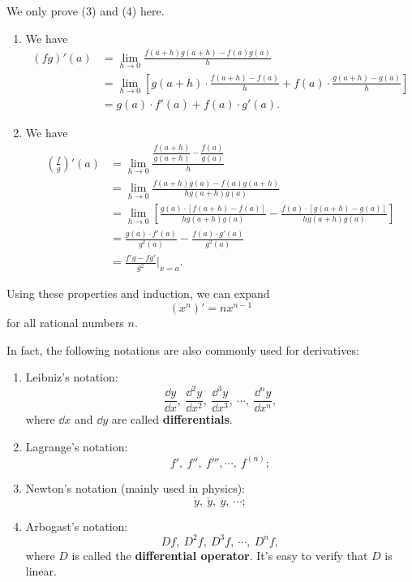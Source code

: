 	\begin{proofenv}
		We only prove (3) and (4) here.
		\begin{enumerate}
			\item[(3)] We have
			\[
			\begin{aligned}
				(fg)'(a) &= \lim_{h\to 0} \frac{f(a+h)g(a+h) - f(a)g(a)}{h}\\[6pt]
				&= \lim_{h\to 0} \left[ g(a+h)\cdot \frac{f(a+h)-f(a)}{h} + f(a)\cdot \frac{g(a+h)-g(a)}{h} \right]\\[6pt]
				&= g(a)\cdot f'(a) + f(a)\cdot g'(a).
			\end{aligned}
			\]
			\item[(4)] We have
			\[
			\begin{aligned}
				\left(\frac{f}{g}\right)'(a) &= \lim_{h\to 0} \frac{\dfrac{f(a+h)}{g(a+h)} - \dfrac{f(a)}{g(a)}}{h}\\[6pt]
				&= \lim_{h\to 0} \frac{f(a+h)g(a) - f(a)g(a+h)}{h g(a+h) g(a)}\\[6pt]
				&= \lim_{h\to 0} \left[ \frac{g(a)\cdot [f(a+h)-f(a)]}{h g(a+h) g(a)} - \frac{f(a)\cdot [g(a+h)-g(a)]}{h g(a+h) g(a)} \right]\\[6pt]
				&= \frac{g(a)\cdot f'(a)}{g^2(a)} - \frac{f(a)\cdot g'(a)}{g^2(a)}\\[6pt]
				&= \frac{f'g - fg'}{g^2}\bigg|_{x=a}.
			\end{aligned}
			\]
		\end{enumerate}
	\end{proofenv}
	\begin{remarkenv}
		Using these properties and induction, we can expand
		\[
		\left( x^n\right)' = n x^{n-1}
		\]
		for all rational numbers $n$.
	\end{remarkenv}
	\begin{notationenv}
		In fact, the following notations are also commonly used for derivatives:
		\begin{enumerate}
			\item Leibniz's notation:
			\[
			\frac{\dd y}{\dd x},\ \frac{\dd^2 y}{\dd x^2},\ \frac{\dd^3 y}{\dd x^3},\ \cdots,\ \frac{\dd^n y}{\dd x^n},
			\]
			where $\dd x$ and $\dd y$ are called \textbf{differentials}.
			\item Lagrange's notation:
			\[
			f',\ f'',\ f''',\cdots,\ f^{(n)};
			\]
			\item Newton's notation (mainly used in physics):
			\[
			\dot{y},\ \ddot{y},\ \dddot{y},\ \cdots;
			\]
			\item Arbogast's notation:
			\[
			Df,\ D^2f,\ D^3f,\ \cdots,\ D^n f,
			\]
			where $D$ is called the \textbf{differential operator}. It's easy to verify that $D$ is linear.
		\end{enumerate}
	\end{notationenv}

